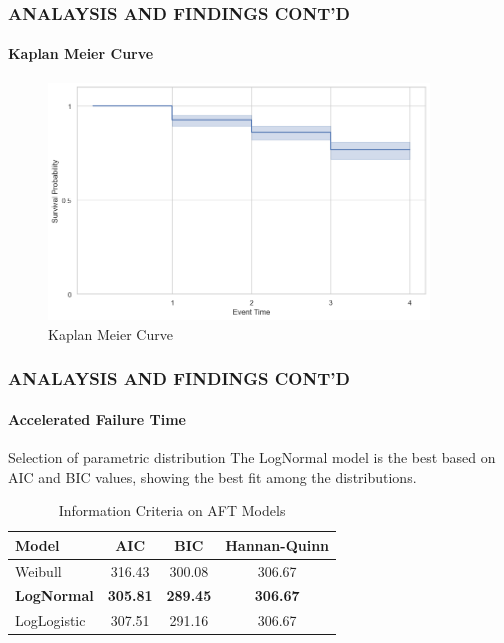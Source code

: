 \documentclass[12pt]{beamer}
\begin{document}
\begin{frame}
    \frametitle{ANALAYSIS AND FINDINGS CONT'D}
     \framesubtitle{Kaplan Meier Curve}

    
		\begin{figure}[H]
			\centering
			\includegraphics[width=0.9\textwidth]{Figure 4/4.1.png}
			\hfill
			\caption{Kaplan Meier Curve}
			
		\end{figure}

\end{frame}

	\begin{frame}
     \frametitle{ANALAYSIS AND FINDINGS CONT'D}

 		\framesubtitle{Accelerated Failure Time}
            \begin{block}{Selection of parametric distribution}
The LogNormal model is the best based on AIC and BIC values, showing the best fit among the distributions.
\end{block}

  \begin{table}[H]
        \centering
        \begin{tabular}{lccc}
            \hline
            Model & AIC & BIC & Hannan-Quinn \\
            \hline
            Weibull & 316.43 & 300.08 & 306.67 \\
            \textbf{LogNormal} & \textbf{305.81} & \textbf{289.45} & \textbf{306.67} \\
            LogLogistic & 307.51 & 291.16 & 306.67 \\
            \hline
        \end{tabular}
        \caption{Information Criteria on AFT Models}
        \label{tab:model_comparison}
    \end{table}

    \end{frame}
	
\end{document}
